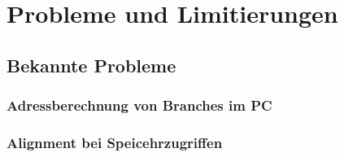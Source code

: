 \chapter{Probleme und Limitierungen} %
\label{Probleme} %

\section{Bekannte Probleme}
\subsection{Adressberechnung von Branches im PC}
\subsection{Alignment bei Speicehrzugriffen}

